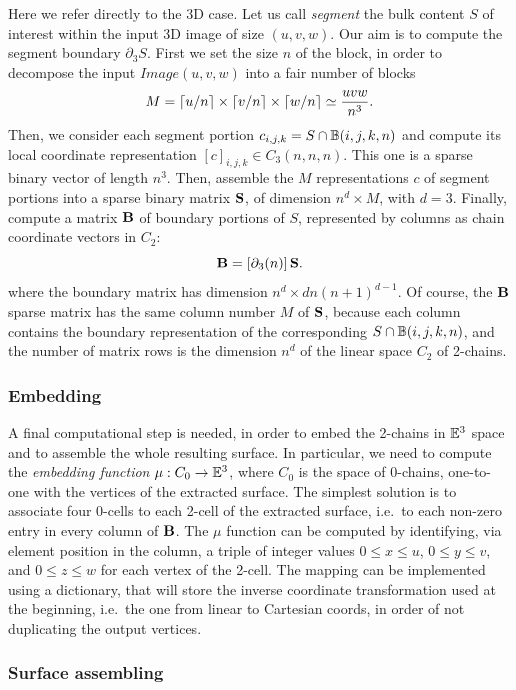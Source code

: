 \documentclass[11pt, oneside]{amsart}   	%
\begin{document}
Here we refer directly to the 3D case.
Let us call \emph{segment} the bulk content $S$ of interest within the input 3D image of size $(u,v,w)$. Our aim is to compute the segment boundary $\partial_3 S$. 
First we set the size $n$ of the block, in order to decompose the input $Image(u,v,w)$ into a fair number of blocks
\[
M = \left\lceil u/n \right\rceil \times \left\lceil v/n \right\rceil \times \left\lceil w/n \right\rceil \simeq \frac{uvw}{n^3}.
\] 
Then, we consider each segment portion $c_{i,j,k} = S\cap \mathbb{B}(i,j,k,n)$ and compute its local coordinate representation  $[c]_{i,j,k}\in C_3(n,n,n)$. This one is a sparse binary vector of length $n^3$. Then, assemble the $M$ representations $c$ of segment portions into a sparse binary matrix ${\bf S}$, of dimension $n^d \times M$, with $d=3$. Finally, compute a matrix ${\bf \textbf{B}}$ of boundary portions of $S$, represented by columns as chain coordinate vectors in $C_2$:
\[
{\bf \textbf{B}} = [\partial_3(n)]\, {\bf S}.
\]
where the boundary matrix has dimension $n^d \times dn(n+1)^{d-1}$.
Of course, the ${\bf \textbf{B}}$ sparse matrix has the same column number $M$ of ${\bf S}$, because each column contains the boundary representation of the corresponding $S \cap \mathbb{B}(i,j,k,n)$, and the number of matrix rows is the dimension $n^d$ of the linear space $C_2$ of 2-chains.

\subsubsection*{Embedding}
A final computational step is needed, in order to embed the 2-chains in $\mathbb{E}^3$ space and to assemble the whole resulting surface. In particular, we need to compute the \emph{embedding function} $\mu : C_0 \to \mathbb{E}^3$, where $C_0$ is the space of 0-chains, one-to-one with the vertices of the extracted surface. The simplest solution is to associate  four 0-cells to each 2-cell of the extracted surface, i.e.~to each non-zero entry in every column of ${\bf \textbf{B}}$.  The $\mu$ function  can be computed by identifying, via  element position in the column, a triple of integer values $0\leq x\leq u$, $0\leq y\leq v$, and $0\leq z\leq w$ for each vertex of the 2-cell.  The mapping can be implemented using a dictionary, that will store the inverse coordinate transformation used at the beginning, i.e.~the one from linear to Cartesian coords, in order of not duplicating the output vertices.   

\subsubsection*{Surface assembling}
\end{document}
